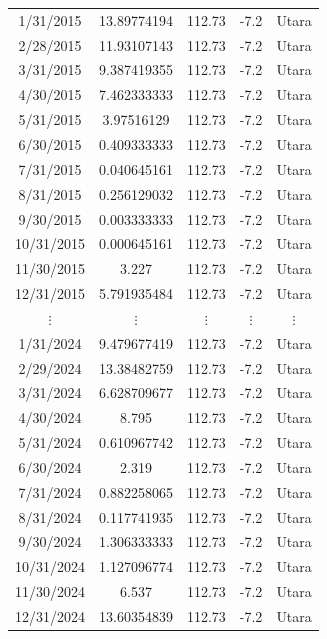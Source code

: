 \begin{longtable}{|c|c|c|c|c|}
    1/31/2015  & 13.89774194  & 112.73 & -7.2 & Utara \\
    2/28/2015  & 11.93107143  & 112.73 & -7.2 & Utara \\
    3/31/2015  & 9.387419355  & 112.73 & -7.2 & Utara \\
    4/30/2015  & 7.462333333  & 112.73 & -7.2 & Utara \\
    5/31/2015  & 3.97516129   & 112.73 & -7.2 & Utara \\
    6/30/2015  & 0.409333333  & 112.73 & -7.2 & Utara \\
    7/31/2015  & 0.040645161  & 112.73 & -7.2 & Utara \\
    8/31/2015  & 0.256129032  & 112.73 & -7.2 & Utara \\
    9/30/2015  & 0.003333333  & 112.73 & -7.2 & Utara \\
    10/31/2015 & 0.000645161  & 112.73 & -7.2 & Utara \\
    11/30/2015 & 3.227        & 112.73 & -7.2 & Utara \\
    12/31/2015 & 5.791935484  & 112.73 & -7.2 & Utara \\
    \multicolumn{1}{|c|}{$\vdots$} &
    \multicolumn{1}{c|}{$\vdots$} &
    \multicolumn{1}{c|}{$\vdots$} &
    \multicolumn{1}{c|}{$\vdots$} &
    \multicolumn{1}{c|}{$\vdots$} \\ 
    1/31/2024  & 9.479677419  & 112.73 & -7.2 & Utara \\
    2/29/2024  & 13.38482759  & 112.73 & -7.2 & Utara \\
    3/31/2024  & 6.628709677  & 112.73 & -7.2 & Utara \\
    4/30/2024  & 8.795         & 112.73 & -7.2 & Utara \\
    5/31/2024  & 0.610967742   & 112.73 & -7.2 & Utara \\
    6/30/2024  & 2.319         & 112.73 & -7.2 & Utara \\
    7/31/2024  & 0.882258065   & 112.73 & -7.2 & Utara \\
    8/31/2024  & 0.117741935   & 112.73 & -7.2 & Utara \\
    9/30/2024  & 1.306333333   & 112.73 & -7.2 & Utara \\
    10/31/2024 & 1.127096774   & 112.73 & -7.2 & Utara \\
    11/30/2024 & 6.537         & 112.73 & -7.2 & Utara \\
    12/31/2024 & 13.60354839   & 112.73 & -7.2 & Utara \\
    \hline


\end{longtable}
